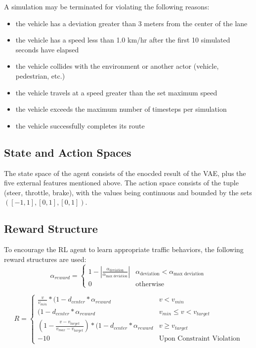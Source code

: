 \documentclass[12pt,oneside,letterpaper]{article}
\begin{document}
A simulation may be terminated for violating the following reasons: \\
\begin{itemize}
\item the vehicle has a deviation greater than 3 meters from the center of the lane
\item the vehicle has a speed less than 1.0 km/hr after the first 10 simulated seconds have elapsed
\item the vehicle collides with the environment or another actor (vehicle, pedestrian, etc.)
\item the vehicle travels at a speed greater than the set maximum speed
\item the vehicle exceeds the maximum number of timesteps per simulation
\item the vehicle successfully completes its route
\end{itemize}

\subsection{State and Action Spaces}
The state space of the agent consists of the enocded result of the VAE, plus the five external features mentioned above. The action space consists of the tuple (steer, throttle, brake), with the values being continuous and bounded by the sets $\left([-1,1],[0,1],[0,1]\right)$.

\subsection{Reward Structure}
To encourage the RL agent to learn appropriate traffic behaviors, the following reward structures are used:
\[ \alpha_{reward}= \begin{cases}
1- | \frac{\alpha_{\text{deviation}}}{\alpha_{\text{max deviation}}} | & \alpha_{\text{deviation}} < \alpha_{\text{max deviation}} \\
0 & \text{otherwise}
\end{cases}
\]

\[ R = \begin{cases}
\frac{v}{v_{min}} * (1- d_{center} * \alpha_{reward}  & v < v_{min} \\
(1- d_{center} * \alpha_{reward}  & v_{min} \leq v <v_{target} \\
\left(1 - \frac{v - v_{target}}{v_{max} - v_{target}} \right) * (1- d_{center} * \alpha_{reward} & v \geq v_{target} \\
-10 & \text{Upon Constraint Violation}
\end{cases}
\]
\end{document}
